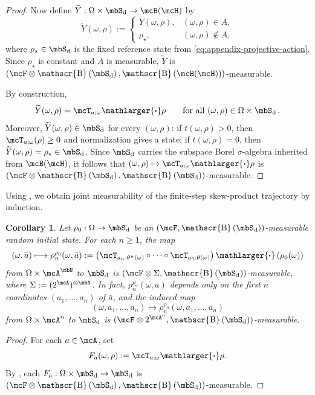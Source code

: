 \documentclass[a4paper]{article}
\numberwithin{equation}{section}   %
\theoremstyle{plain}   %
\theoremstyle{plain}   %
\newtheorem{cor}[lemma]{Corollary}   %
\theoremstyle{examplestyle}
\DeclareMathOperator{\states}{\mbS_d}   %
\DeclareMathOperator{\dummyborel}{\mathscr{B}}                  %
\newcommand\borel[1]{\dummyborel\left(#1\right)}    %
\newcommand{\proj}{{\mathlarger{\boldsymbol{\cdot}}}} %
\begin{document}
\begin{appendix}
\begin{proof}
            Now define \(\widetilde Y:\Omega\times\states\to\mcB(\mcH)\) by
            \[
                \widetilde Y(\omega,\rho)
                :=
                \begin{cases}
                    Y(\omega,\rho), & (\omega,\rho)\in A,\\[0.5ex]
                    \rho_\star, & (\omega,\rho)\notin A,
                \end{cases}
            \]
            where \(\rho_\star\in\states\) is the fixed reference state from \eqref{eq:appendix-projective-action}. Since \(\rho_\star\) is constant and \(A\) is measurable, \(\widetilde Y\) is \((\mcF\otimes\borel{\states},\borel{\mcB(\mcH)})\)-measurable.
        
            By construction,
            \[
                \widetilde Y(\omega,\rho)=\mcT_{a;\omega}\proj\rho
                \qquad\text{for all }(\omega,\rho)\in\Omega\times\states.
            \]
            Moreover, \(\widetilde Y(\omega,\rho)\in\states\) for every \((\omega,\rho)\): if \(t(\omega,\rho)>0\), then \(\mcT_{a;\omega}(\rho)\ge0\) and normalization gives a state; if \(t(\omega,\rho)=0\), then \(\widetilde Y(\omega,\rho)=\rho_\star\in\states\).
            Since \(\states\) carries the subspace Borel \(\sigma\)-algebra inherited from \(\mcB(\mcH)\), it follows that \((\omega,\rho)\mapsto \mcT_{a;\omega}\proj\rho\) is \((\mcF\otimes\borel{\states},\borel{\states})\)-measurable.
        \end{proof}

    Using , we obtain joint measurability of the finite-step skew-product trajectory by induction.

    \begin{cor}
    \label{lem:rho-n-measurable}
        Let \(\rho_0:\Omega\to\states\) be an \((\mcF,\borel{\states})\)-measurable random initial state.
        For each \(n\ge1\), the map
        \[
            (\omega,\bar a)
            \longmapsto
            \rho_n^{\rho_0}(\omega,\bar a)
            :=
            \left(\mcT_{a_n;\theta^n(\omega)}\circ\cdots\circ
                  \mcT_{a_1;\theta(\omega)}\right)\proj
            \left(\rho_0(\omega)\right)
        \]
        from \(\Omega\times\mcA^\mbN\) to \(\states\) is
        \((\mcF\otimes\Sigma,\borel{\states})\)-measurable, where
        \(\Sigma:=(2^\mcA)^{\otimes\mbN}\).
        In fact, \(\rho_n^{\rho_0}(\omega,\bar a)\) depends only on the first \(n\)
        coordinates \((a_1,\dots,a_n)\) of \(\bar a\), and the induced map
        \[
            (\omega,a_1,\dots,a_n)\longmapsto
            \rho_n^{\rho_0}(\omega,a_1,\dots,a_n)
        \]
        from \(\Omega\times\mcA^n\) to \(\states\) is
        \((\mcF\otimes 2^{\mcA^n},\borel{\states})\)-measurable.
    \end{cor}
        \begin{proof}
            For each \(a\in\mcA\), set
            \[
                F_a(\omega,\rho):=\mcT_{a;\omega}\proj\rho.
            \]
            By , each
            \(F_a:\Omega\times\states\to\states\) is
            \((\mcF\otimes\borel{\states},\borel{\states})\)-measurable.
        

\end{proof}
\end{appendix}
\end{document}
